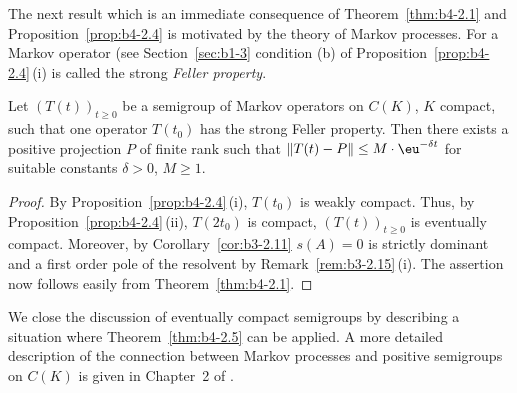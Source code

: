 The next result which is an immediate consequence of Theorem~\ref{thm:b4-2.1} and
Proposition~\ref{prop:b4-2.4} is motivated by the theory of Markov processes.
For a Markov operator (see Section~\ref{sec:b1-3} condition (b) of Proposition~\ref{prop:b4-2.4}\,(i) is called the strong \emph{Feller property}. 
\begin{theorem}\label{thm:b4-2.5}
	Let $(T(t))_{t \geq 0}$ be a semigroup of Markov operators on
	$C(K)$, $K$ compact, such that one operator $T(t_{0})$ has the strong Feller
	property.
	Then there exists a positive projection $P$ of finite rank
	such that $\|T(t) - P\| \leq M\cdot \eu^{-\delta t}$ for suitable constants $\delta>0$, $M \geq 1$.
\end{theorem}
\begin{proof}
	By Proposition~\ref{prop:b4-2.4}\,(i), $T(t_{0})$ is weakly compact.
	Thus, by Proposition~\ref{prop:b4-2.4}\,(ii),
	$T(2t_{0})$ is compact, \ie  $(T(t))_{t \geq 0}$ is eventually compact.
	Moreover,
	by Corollary~\ref{cor:b3-2.11} $s(A) = 0$ is strictly dominant and a first order
	pole of the resolvent by Remark~\ref{rem:b3-2.15}\,(i).
	The assertion now follows
	easily from Theorem~\ref{thm:b4-2.1}.
\end{proof}
We close the discussion of eventually compact semigroups by describing
a situation where Theorem~\ref{thm:b4-2.5} can be applied.
A more detailed description
of the connection between Markov processes and positive semigroups on
$C(K)$ is given in Chapter~2 of \textcite{vancasteren:1985}.
